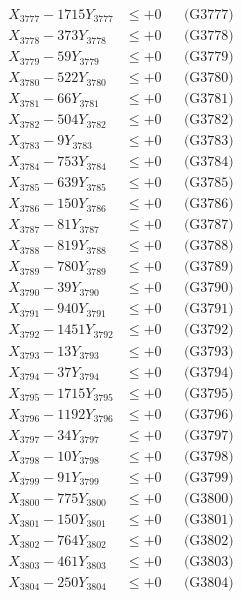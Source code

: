 \documentclass[a4paper,10pt]{article}
\begin{document}
{\begin{align}
X_{3777} - 1715Y_{3777} &\leq +0 && \text{(G3777)} \\
X_{3778} - 373Y_{3778} &\leq +0 && \text{(G3778)} \\
X_{3779} - 59Y_{3779} &\leq +0 && \text{(G3779)} \\
X_{3780} - 522Y_{3780} &\leq +0 && \text{(G3780)} \\
\allowbreak
X_{3781} - 66Y_{3781} &\leq +0 && \text{(G3781)} \\
X_{3782} - 504Y_{3782} &\leq +0 && \text{(G3782)} \\
X_{3783} - 9Y_{3783} &\leq +0 && \text{(G3783)} \\
X_{3784} - 753Y_{3784} &\leq +0 && \text{(G3784)} \\
X_{3785} - 639Y_{3785} &\leq +0 && \text{(G3785)} \\
X_{3786} - 150Y_{3786} &\leq +0 && \text{(G3786)} \\
X_{3787} - 81Y_{3787} &\leq +0 && \text{(G3787)} \\
X_{3788} - 819Y_{3788} &\leq +0 && \text{(G3788)} \\
X_{3789} - 780Y_{3789} &\leq +0 && \text{(G3789)} \\
X_{3790} - 39Y_{3790} &\leq +0 && \text{(G3790)} \\
\allowbreak
X_{3791} - 940Y_{3791} &\leq +0 && \text{(G3791)} \\
X_{3792} - 1451Y_{3792} &\leq +0 && \text{(G3792)} \\
X_{3793} - 13Y_{3793} &\leq +0 && \text{(G3793)} \\
X_{3794} - 37Y_{3794} &\leq +0 && \text{(G3794)} \\
X_{3795} - 1715Y_{3795} &\leq +0 && \text{(G3795)} \\
X_{3796} - 1192Y_{3796} &\leq +0 && \text{(G3796)} \\
X_{3797} - 34Y_{3797} &\leq +0 && \text{(G3797)} \\
X_{3798} - 10Y_{3798} &\leq +0 && \text{(G3798)} \\
X_{3799} - 91Y_{3799} &\leq +0 && \text{(G3799)} \\
X_{3800} - 775Y_{3800} &\leq +0 && \text{(G3800)} \\
\allowbreak
X_{3801} - 150Y_{3801} &\leq +0 && \text{(G3801)} \\
X_{3802} - 764Y_{3802} &\leq +0 && \text{(G3802)} \\
X_{3803} - 461Y_{3803} &\leq +0 && \text{(G3803)} \\
X_{3804} - 250Y_{3804} &\leq +0 && \text{(G3804)} \\

\end{align}}
\end{document}
